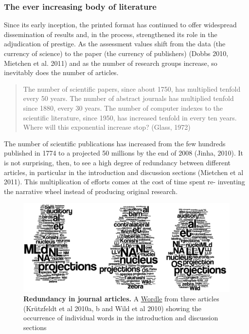 \documentclass[final,authoryear,3p]{elsarticle-open-drafting}
\begin{document}
\subsubsection{The ever increasing body of literature}

Since its early inception, the printed format has continued to offer widespread dissemination of results and, in the process, 
strengthened its role in the adjudication of prestige. As the assessment values shift from the data (the currency of science) to the 
paper (the currency of publishers) (Dobbs 2010, Mietchen et al. 2011) and as the number of research groups increase, so 
inevitably does the number of articles.  

\begin{quote}
The number of scientific papers, since about 1750, has multiplied tenfold every 50 years. The number of abstract journals has 
multiplied tenfold since 1880, every 30 years. The number of computer indexes to the scientific literature, since 1950, has 
increased tenfold in every ten years. Where will this exponential increase stop? (Glass, 1972)
\end{quote}

The number of scientific publications has increased from the few hundreds published in 1774 to a projected 50 millions by the 
end of 2008 (Jinha, 2010). It is not surprising, then, to see a high degree of redundancy between different articles, in particular in 
the introduction and discussion sections (Mietchen et al 2011). This multiplication of efforts comes at the cost of time spent re-
inventing the narrative wheel instead of producing original research.


\begin{figure}[!ht]
	\begin{center}
		\includegraphics[width=13cm]{Images/Papers-wordle.png}
		\caption{
		{\bf Redundancy in journal articles.} A \href{http://www.wordle.net}{Wordle} from three articles (Kr{\"u}tzfeldt et al 2010a, b and Wild et al 2010) showing the occurrence of individual words in the introduction and discussion sections
		}
		\label{Figure:Wordle}
	\end{center}
\end{figure}
\end{document}
